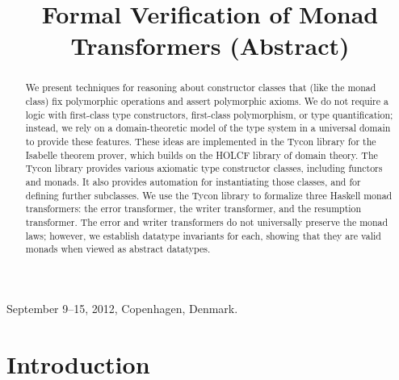 \documentclass{sigplanconf}
\theoremstyle{definition}
\begin{document}
 {September 9--15, 2012, Copenhagen, Denmark.}
\authorpermission


\title{Formal Verification of Monad Transformers (Abstract)}


\maketitle

\begin{abstract}
We present techniques for reasoning about constructor classes that (like the monad class) fix polymorphic operations and assert polymorphic axioms. We do not require a logic with first-class type constructors, first-class polymorphism, or type quantification; instead, we rely on a domain-theoretic model of the type system in a universal domain to provide these features.
These ideas are implemented in the Tycon library for the Isabelle theorem prover, which builds on the HOLCF library of domain theory. The Tycon library provides various axiomatic type constructor classes, including functors and monads. It also provides automation for instantiating those classes, and for defining further subclasses.
We use the Tycon library to formalize three Haskell monad transformers: the error transformer, the writer transformer, and the resumption transformer. The error and writer transformers do not universally preserve the monad laws; however, we establish datatype invariants for each, showing that they are valid monads when viewed as abstract datatypes.
\end{abstract}



\section{Introduction}

\end{document}
